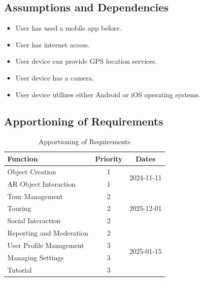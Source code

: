 \documentclass{article}
\begin{document}
\subsection{Assumptions and Dependencies}

\begin{itemize}
    \item User has used a mobile app before.
    \item User has internet access.
    \item User device can provide GPS location services.
    \item User device has a camera.
    \item User device utilizes either Android or iOS operating systems.
\end{itemize}

\subsection{Apportioning of Requirements}

\begin{table}[]
    \caption{Apportioning of Requirements}
    \label{tab:apportioning_table}
    \centering
    \begin{tabular}{lcc}
        \toprule
        \textbf{Function}        & \textbf{Priority} & \textbf{Dates}              \\
        \hline \hline
        Object Creation          & 1                 & \multirow{2}{*}{2024-11-11} \\
        AR Object Interaction    & 1                 &                             \\ \hline
        Tour Management          & 2                 & \multirow{3}{*}{2025-12-01} \\
        Touring                  & 2                 &                             \\
        Social Interaction       & 2                 &                             \\
        Reporting and Moderation & 2                 & \multirow{4}{*}{2025-01-15} \\ \hline
        User Profile Management  & 3                 &                             \\
        Managing Settings        & 3                 &                             \\
        Tutorial                 & 3                 &                             \\
        \hline
    \end{tabular}
\end{table}
\end{document}
